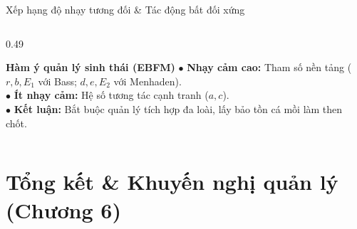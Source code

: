 \documentclass[aspectratio=169, 10pt]{beamer}
\begin{document}
\begin{frame}{Xếp hạng độ nhạy tương đối \& Tác động bất đối xứng}
\begin{columns}[c]
\begin{column}{0.49\textwidth}
      \vspace{0.12cm}
      \begin{block}{\textbf{Hàm ý quản lý sinh thái (EBFM)}}
        \footnotesize
        $\bullet$ \textbf{Nhạy cảm cao:} Tham số nền tảng ($r, b, E_1$ với Bass; $d, e, E_2$ với Menhaden).\\
        $\bullet$ \textbf{Ít nhạy cảm:} Hệ số tương tác cạnh tranh ($a, c$).\\
        $\bullet$ \textbf{Kết luận:} Bắt buộc quản lý tích hợp đa loài, lấy bảo tồn cá mồi làm then chốt.
      \end{block}
    \end{column}
  \end{columns}
\end{frame}

\section{Tổng kết \& Khuyến nghị quản lý (Chương 6)}
\end{document}
